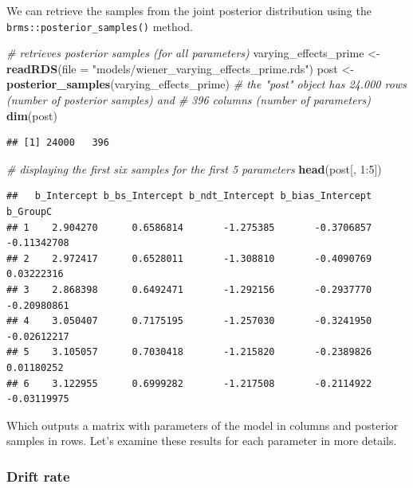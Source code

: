 \documentclass[
  11pt,
  english,
  ,doc,floatsintext]{apa6}
\newenvironment{Shaded}{}{}
\newcommand{\CommentTok}[1]{\textcolor[rgb]{0.38,0.63,0.69}{\textit{#1}}}
\newcommand{\DataTypeTok}[1]{\textcolor[rgb]{0.56,0.13,0.00}{#1}}
\newcommand{\DecValTok}[1]{\textcolor[rgb]{0.25,0.63,0.44}{#1}}
\newcommand{\KeywordTok}[1]{\textcolor[rgb]{0.00,0.44,0.13}{\textbf{#1}}}
\newcommand{\NormalTok}[1]{#1}
\newcommand{\OperatorTok}[1]{\textcolor[rgb]{0.40,0.40,0.40}{#1}}
\newcommand{\StringTok}[1]{\textcolor[rgb]{0.25,0.44,0.63}{#1}}
\begin{document}
We can retrieve the samples from the joint posterior distribution using the \texttt{brms::posterior\_samples()} method.

\begin{Shaded}
\begin{Highlighting}[]
\CommentTok{# retrieves posterior samples (for all parameters)}
\NormalTok{varying_effects_prime <-}\StringTok{ }\KeywordTok{readRDS}\NormalTok{(}\DataTypeTok{file =} \StringTok{"models/wiener_varying_effects_prime.rds"}\NormalTok{)}
\NormalTok{post <-}\StringTok{ }\KeywordTok{posterior_samples}\NormalTok{(varying_effects_prime)}
\CommentTok{# the "post" object has 24.000 rows (number of posterior samples) and}
\CommentTok{# 396 columns (number of parameters)}
\KeywordTok{dim}\NormalTok{(post)}
\end{Highlighting}
\end{Shaded}

\begin{verbatim}
## [1] 24000   396
\end{verbatim}

\begin{Shaded}
\begin{Highlighting}[]
\CommentTok{# displaying the first six samples for the first 5 parameters}
\KeywordTok{head}\NormalTok{(post[, }\DecValTok{1}\OperatorTok{:}\DecValTok{5}\NormalTok{])}
\end{Highlighting}
\end{Shaded}

\begin{verbatim}
##   b_Intercept b_bs_Intercept b_ndt_Intercept b_bias_Intercept    b_GroupC
## 1    2.904270      0.6586814       -1.275385       -0.3706857 -0.11342708
## 2    2.972417      0.6528011       -1.308810       -0.4090769  0.03222316
## 3    2.868398      0.6492471       -1.292156       -0.2937770 -0.20980861
## 4    3.050407      0.7175195       -1.257030       -0.3241950 -0.02612217
## 5    3.105057      0.7030418       -1.215820       -0.2389826  0.01180252
## 6    3.122955      0.6999282       -1.217508       -0.2114922 -0.03119975
\end{verbatim}

Which outputs a matrix with parameters of the model in columns and posterior samples in rows. Let's examine these results for each parameter in more details.

\hypertarget{drift-rate}{%
\subsubsection{Drift rate}\label{drift-rate}}
\end{document}
